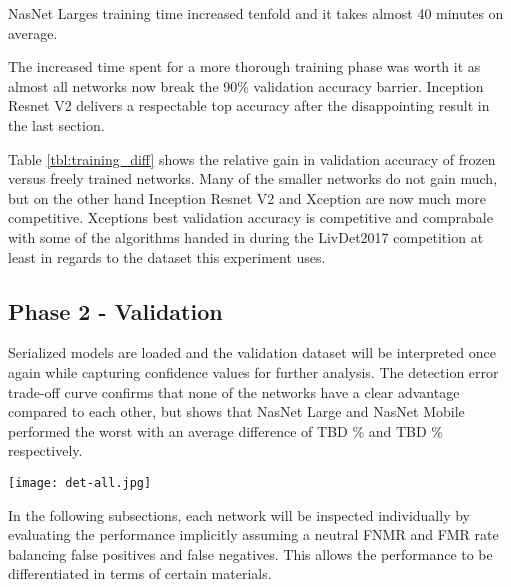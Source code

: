 


NasNet Larges training time increased tenfold and it takes almost 40 minutes on average.





The increased time spent for a more thorough training phase was worth it as almost all networks now break the 90\% validation accuracy barrier.
Inception Resnet V2 delivers a respectable top accuracy after the disappointing result in the last section.





Table \ref{tbl:training_diff} shows the relative gain in validation accuracy of frozen versus freely trained networks.
Many of the smaller networks do not gain much, but on the other hand Inception Resnet V2 and Xception are now much more competitive.
Xceptions best validation accuracy is competitive and comprabale with some of the algorithms handed in during the LivDet2017 competition at least in regards to the dataset this experiment uses. \cite{LIVDET}

\hfill

\subsection{Phase 2 - Validation}
Serialized models are loaded and the validation dataset will be interpreted once again while capturing confidence values for further analysis.
The detection error trade-off curve confirms that none of the networks have a clear advantage compared to each other, but shows that NasNet Large and NasNet Mobile performed the worst with an average difference of TBD \% and TBD \% respectively.



\texttt{[image: det-all.jpg]}


In the following subsections, each network will be inspected individually by evaluating the performance implicitly assuming a neutral FNMR and FMR rate balancing false positives and false negatives.
This allows the performance to be differentiated in terms of certain materials.



